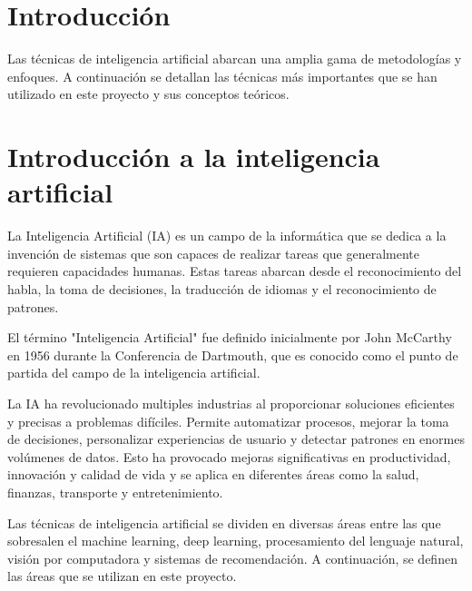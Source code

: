 
\section{Introducción}


Las técnicas de inteligencia artificial abarcan una amplia gama de metodologías y enfoques. A continuación se detallan las técnicas más importantes que se han utilizado en este proyecto y sus conceptos teóricos.




\section{Introducción a la inteligencia artificial}

La Inteligencia Artificial (IA) es un campo de la informática que se dedica a la invención de sistemas que son capaces de realizar tareas que generalmente requieren capacidades humanas. Estas tareas abarcan desde el reconocimiento del habla, la toma de decisiones, la traducción de idiomas y el reconocimiento de patrones.

El término "Inteligencia Artificial" fue definido inicialmente por John McCarthy en 1956 durante la Conferencia de Dartmouth, que es conocido como el punto de partida del campo de la inteligencia artificial.

La IA ha revolucionado multiples industrias al proporcionar soluciones eficientes y precisas a problemas difíciles. Permite automatizar procesos, mejorar la toma de decisiones, personalizar experiencias de usuario y detectar patrones en enormes volúmenes de datos. Esto ha provocado mejoras significativas en productividad, innovación y calidad de vida y se aplica en diferentes áreas como la salud, finanzas, transporte y entretenimiento.

Las técnicas de inteligencia artificial se dividen en diversas áreas entre las que sobresalen el machine learning, deep learning, procesamiento del lenguaje natural, visión por computadora y sistemas de recomendación. A continuación, se definen las áreas que se utilizan en este proyecto.


